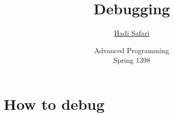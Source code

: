 \documentclass[xcolor={dvipsnames}]{beamer}
\title{Debugging}
\author{\href{mailto:hadi.safari@ut.ac.ir?subject=[AP\%20S98]\%20}{Hadi Safari}}
\institute[University of Tehran]{
    \resizebox{!}{10ex}{}\\
    University of Tehran
}
\date[Advanced Programming (S98)]{
    Advanced Programming\\
    \small Spring 1398
}
\begin{document}
\frame{\titlepage}



\section{How to debug}



\end{document}
